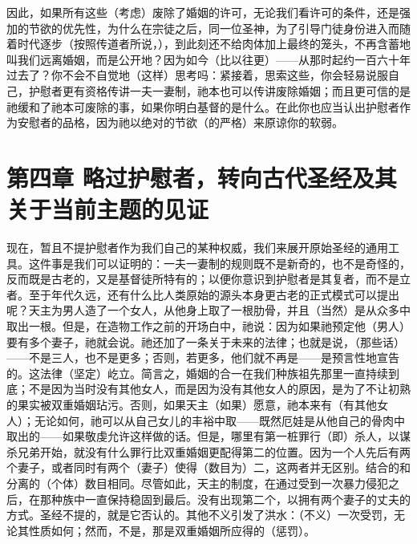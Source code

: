因此，如果所有这些（考虑）废除了婚姻的许可，无论我们看许可的条件，还是强加的节欲的优先性，为什么在宗徒之后，同一位圣神，为了引导门徒身份进入而随着时代逐步（按照传道者所说，），到此刻还不给肉体加上最终的笼头，不再含蓄地叫我们远离婚姻，而是公开地？因为如今（比以往更）——从那时起约一百六十年过去了？你不会不自觉地（这样）思考吗：紧接着，思索这些，你会轻易说服自己，护慰者更有资格传讲一夫一妻制，祂本也可以传讲废除婚姻；而且更可信的是祂缓和了祂本可废除的事，如果你明白基督的是什么。在此你也应当认出护慰者作为安慰者的品格，因为祂以绝对的节欲（的严格）来原谅你的软弱。\par


\section{第四章 略过护慰者，转向古代圣经及其关于当前主题的见证}

现在，暂且不提护慰者作为我们自己的某种权威，我们来展开原始圣经的通用工具。这件事是我们可以证明的：一夫一妻制的规则既不是新奇的，也不是奇怪的，反而既是古老的，又是基督徒所特有的；以便你意识到护慰者是其复者，而不是立者。至于年代久远，还有什么比人类原始的源头本身更古老的正式模式可以提出呢？天主为男人造了一个女人，从他身上取了一根肋骨，并且（当然）是从众多中取出一根。但是，在造物工作之前的开场白中，祂说：因为如果祂预定他（男人）要有多个妻子，祂就会说。祂还加了一条关于未来的法律；也就是说，（那些话）——不是三人，也不是更多；否则，若更多，他们就不再是——是预言性地宣告的。这法律（坚定）屹立。简言之，婚姻的合一在我们种族祖先那里一直持续到底；不是因为当时没有其他女人，而是因为没有其他女人的原因，是为了不让初熟的果实被双重婚姻玷污。否则，如果天主（如果）愿意，祂本来有（有其他女人）；无论如何，祂可以从自己女儿的丰裕中取——既然厄娃是从他自己的骨肉中取出的——如果敬虔允许这样做的话。但是，哪里有第一桩罪行（即）杀人，以谋杀兄弟开始，就没有什么罪行比双重婚姻更配得第二的位置。因为一个人先后有两个妻子，或者同时有两个（妻子）使得（数目为）二，这两者并无区别。结合的和分离的（个体）数目相同。尽管如此，天主的制度，在通过受到一次暴力侵犯之后，在那种族中一直保持稳固到最后。没有出现第二个，以拥有两个妻子的丈夫的方式。圣经不提的，就是它否认的。其他不义引发了洪水：（不义）一次受罚，无论其性质如何；然而，不是，那是双重婚姻所应得的（惩罚）。\par

